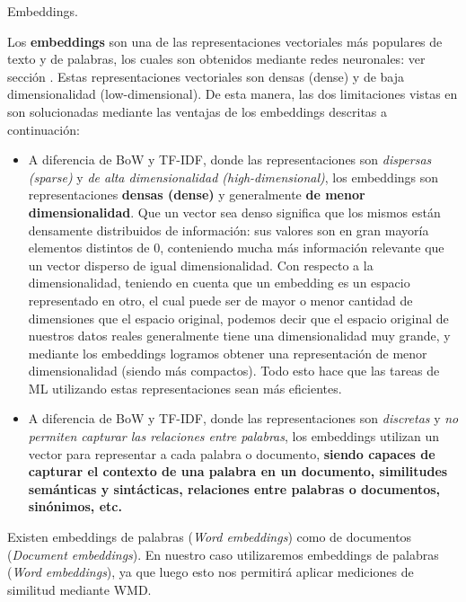 \documentclass[12pt,a4paper]{article}
\makeatletter
\renewcommand\paragraph{\@startsection{paragraph}{4}{\z@}
            {-2.5ex\@plus -1ex \@minus -.25ex}
            {1.25ex \@plus .25ex}
            {\normalfont\normalsize\bfseries}}
\makeatother
\begin{document}
\begin{sloppypar}
\paragraph{Embeddings.}\label{embedd}

Los \textbf{embeddings} son una de las representaciones vectoriales más populares de texto y de palabras, los cuales son obtenidos mediante redes neuronales: ver sección \textit{}. Estas representaciones vectoriales son densas (dense) y de baja dimensionalidad (low-dimensional)\cite{NLP_26}. De esta manera, las dos limitaciones vistas en \textit{} son solucionadas mediante las ventajas de los embeddings descritas a continuación:
\begin{itemize}
\item A diferencia de BoW y TF-IDF, donde las representaciones son \textit{dispersas (sparse)} y \textit{de alta dimensionalidad (high-dimensional)}, los embeddings son representaciones \textbf{densas (dense)} y generalmente \textbf{de menor dimensionalidad}. Que un vector sea denso significa que los mismos están densamente distribuidos de información: sus valores son en gran mayoría elementos distintos de 0, conteniendo mucha más información relevante que un vector disperso de igual dimensionalidad\cite{NLP_9}. Con respecto a la dimensionalidad, teniendo en cuenta que un embedding es un espacio representado en otro, el cual puede ser de mayor o menor cantidad de dimensiones que el espacio original, podemos decir que el espacio original de nuestros datos reales generalmente tiene una dimensionalidad muy grande, y mediante los embeddings logramos obtener una representación de menor dimensionalidad (siendo más compactos)\cite{apunte_uba}. Todo esto hace que las tareas de ML utilizando estas representaciones sean más eficientes. 
\item A diferencia de BoW y TF-IDF, donde las representaciones son \textit{discretas} y \textit{no permiten capturar las relaciones entre palabras}, los embeddings utilizan un vector para representar a cada palabra o documento, \textbf{siendo capaces de capturar el contexto de una palabra en un documento, similitudes semánticas y sintácticas, relaciones entre palabras o documentos, sinónimos, etc.} 
\end{itemize}

Existen embeddings de palabras (\textit{Word embeddings}) como de documentos (\textit{Document embeddings})\cite{NLP_10}. En nuestro caso utilizaremos embeddings de palabras (\textit{Word embeddings}), ya que luego esto nos permitirá aplicar mediciones de similitud mediante WMD. 


\end{sloppypar}
\end{document}
